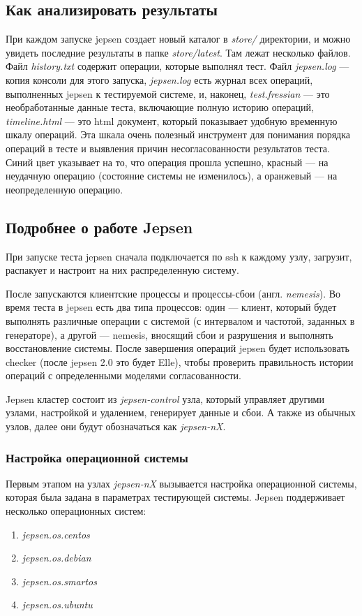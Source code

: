 \documentclass[12pt,  openany]{book}
\begin{document}
\subsection{Как анализировать результаты}
При каждом запуске jepsen создает новый каталог в \textit{store/} директории, и можно увидеть последние результаты в папке \textit{store/latest}. Там лежат несколько файлов.  Файл \textit{history.txt} содержит операции, которые выполнял тест.  Файл \textit{jepsen.log} --- копия консоли для этого запуска, \textit{jepsen.log} есть журнал всех операций, выполненных jepsen к тестируемой системе, и, наконец, \textit{test.fressian} --- это необработанные данные теста, включающие полную историю операций, \textit{timeline.html} --- это html документ, который показывает удобную временную шкалу операций. Эта шкала очень полезный инструмент для понимания порядка операций в тесте и выявления причин несогласованности результатов теста. Синий цвет указывает на то, что операция прошла успешно, красный --- на неудачную операцию (состояние системы не изменилось), а оранжевый --- на неопределенную операцию.

\subsection{Подробнее о работе Jepsen}
При запуске теста jepsen сначала подключается по ssh к каждому узлу, загрузит, распакует и настроит на них распределенную систему.
\par После запускаются клиентские процессы и процессы-сбои (англ. \textit{nemesis}). Во время теста в jepsen есть два типа процессов: один --- клиент, который будет выполнять различные операции с системой (с интервалом и частотой, заданных в генераторе), а другой --- nemesis, вносящий сбои и разрушения и выполнять восстановление системы. После завершения операций jepsen будет использовать checker (после jepsen 2.0 это будет Elle), чтобы проверить правильность истории операций с определенными моделями согласованности.
\par Jepsen кластер состоит из \textit{jepsen-control} узла, который управляет другими узлами, настройкой и удалением, генерирует данные и сбои. А также из обычных узлов, далее они будут обозначаться как \textit{jepsen-nX}. 
\subsubsection{Настройка операционной системы}
Первым этапом на узлах \textit{jepsen-nX} вызывается настройка операционной системы,  которая была задана в параметрах тестирующей системы. Jepsen поддерживает несколько операционных систем: 
\begin{enumerate}
\item \textit{jepsen.os.centos}
\item \textit{jepsen.os.debian}
\item \textit{jepsen.os.smartos}
\item \textit{jepsen.os.ubuntu}
\end{enumerate}
\end{document}
